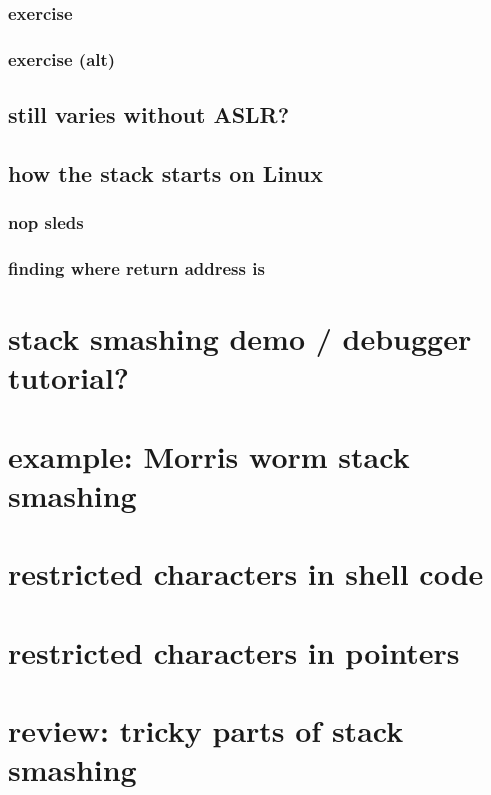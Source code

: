 \subsubsection{exercise}


\subsubsection{exercise (alt)}


\subsection{still varies without ASLR?}


\subsection{how the stack starts on Linux}


\subsubsection{nop sleds}




\subsubsection{finding where return address is}


\section{stack smashing demo / debugger tutorial?}


\section{example: Morris worm stack smashing}



\section{restricted characters in shell code}
   

\section{restricted characters in pointers}


\section{review: tricky parts of stack smashing}

